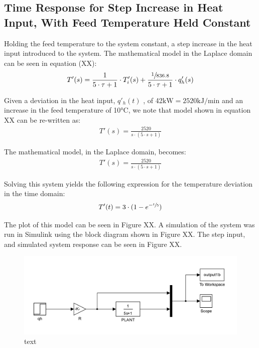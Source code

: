 \documentclass{article}
\begin{document}
\subsection{Time Response for Step Increase in Heat Input, With Feed Temperature Held Constant}
Holding the feed temperature to the system constant, a step increase in the heat input introduced to the system. The mathematical model in the Laplace domain can be seen in equation (XX):
\begin{align}
T'(s) = \frac{1}{5 \cdot \tau + 1} \cdot T'_i(s) + \frac{\sfrac{1}{836.8}}{5 \cdot \tau + 1} \cdot q'_h(s)
\end{align} 

Given a deviation in the heat input, $q'_h(t)$ , of 42$\si{\kilo\watt} = 2520\si{\kilo\joule\per\minute}$ and an increase in the feed temperature of 10$\si{\degreeCelsius}$, we note that model shown in equation XX can be re-written as:
\begin{align}
T'(s) = \frac{2520}{s \cdot (5 \cdot s + 1)}
\end{align}

The mathematical model, in the Laplace domain, becomes:
\begin{align}
T'(s) = \frac{2520}{s \cdot (5 \cdot s + 1)}
\end{align}

Solving this system yields the following expression for the temperature deviation in the time domain:
\begin{align}
T'(t) = 3 \cdot (1 - e^{-\sfrac{t}{5}})
\end{align}

The plot of this model can be seen in Figure XX. A simulation of the system was run in Simulink using the block diagram shown in Figure XX. The step input, and simulated system response can be seen in Figure XX.

\begin{figure}[h]
\centering
\includegraphics[scale=0.2]{block_1b}
\caption{text}
\end{figure}
\end{document}
